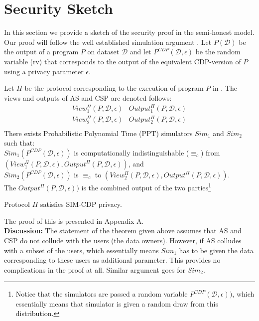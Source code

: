 \section{\system Security Sketch}



In this section we provide a sketch of the security proof in the semi-honest model.
Our proof will follow the well established simulation argument \cite{Oded}. Let
$P(\mathcal{D})$ be the output of a program $P$ on dataset
$\mathcal{D}$ and let $P^{CDP}(\mathcal{D},\epsilon)$ be the random
variable (rv) that corresponds to the output of the equivalent
\textsf{CDP}-version of $P$ using a privacy parameter $\epsilon$.

\begin{theorem}  
\rm
Let $\Pi$ be the protocol corresponding to the execution of program $P$ in \system. The
views and outputs of \textsf{AS} and \textsf{CSP} are denoted follows:
\[
\begin{array}{cc}
View_1^{\Pi}(P,\mathcal{D},\epsilon) & Output_1^{\Pi}(P,\mathcal{D},\epsilon) \\
View_2^{\Pi}(P,\mathcal{D},\epsilon) & Output_2^{\Pi}(P,\mathcal{D},\epsilon) \\
\end{array}
\]
There exists Probabilistic Polynomial Time (PPT) simulators $Sim_1$
and $Sim_2$ such that:\medskip\\
$Sim_1 (P^{CDP}(\mathcal{D},\epsilon))$ is computationally indistinguishable ($\equiv_c$)
from $(View_1^{\Pi}(P,\mathcal{D},\epsilon),Output^{\Pi}(P,\mathcal{D},\epsilon))$, and\\
$Sim_2 (P^{CDP}(\mathcal{D},\epsilon))$ is $\equiv_c$
to $(View_2^{\Pi}(P,\mathcal{D},\epsilon),Output^{\Pi}(P,\mathcal{D},\epsilon))$.\medskip\\
The $Output^{\Pi}(P,\mathcal{D},\epsilon))$ is the combined output of the two
parties\footnote{Notice that the simulators are passed a random variable $P^{CDP}(\mathcal{D},\epsilon))$,
which essentially means that simulator is given a random draw from this distribution.}

\end{theorem}
\noindent
\begin{corollary} Protocol $\Pi$ satisfies \textsf{SIM-CDP} \cite{CDP} privacy.\end{corollary}
\noindent
The proof of this is presented in Appendix A.
\\
{\bf Discussion:} The statement of the theorem given above assumes
that \textsf{AS} and \textsf{CSP} do not collude with the users (the
data owners). However, if \textsf{AS} colludes with a subset of the
users, which essentially means $Sim_1$ has to be given the data
corresponding to these users as additional parameter. This provides no
complications in the proof at all.  Similar argument goes for $Sim_2$.